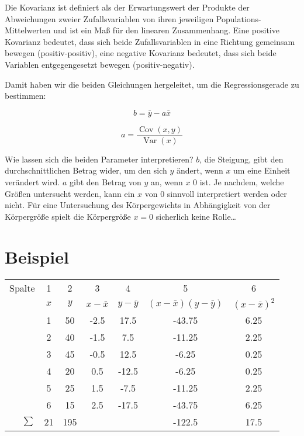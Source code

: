 \documentclass[ngerman, 12pt]{scrartcl}
\DeclareMathOperator{\cov}{Cov}
\DeclareMathOperator{\var}{Var}
\begin{document}
 
\begin{infobox}
Die Kovarianz ist definiert als der Erwartungswert der Produkte der Abweichungen zweier Zufallsvariablen von ihren jeweiligen Populations-Mittelwerten und ist ein Maß für den linearen Zusammenhang. Eine positive Kovarianz bedeutet, dass sich beide Zufallsvariablen in eine Richtung gemeinsam bewegen (positiv-positiv), eine negative Kovarianz bedeutet, dass sich beide Variablen entgegengesetzt bewegen (positiv-negativ).
\end{infobox}


Damit haben wir die beiden Gleichungen hergeleitet, um die Regressionsgerade zu bestimmen:

\begin{equation}
b=\bar{y} - a \bar{x}
\end{equation}


\begin{equation}
a =  \dfrac{\cov(x,y)}{\var(x)}
\end{equation}

Wie lassen sich die beiden Parameter interpretieren? \(b\), die Steigung, gibt den durchschnittlichen Betrag wider, um den sich \(y\) ändert, wenn \(x\) um eine Einheit verändert wird. \(a\) gibt den Betrag von \(y\) an, wenn \(x\) 0 ist. Je nachdem, welche Größen untersucht werden, kann ein \(x\) von 0 sinnvoll interpretiert werden oder nicht. Für eine Untersuchung des  Körpergewichts in Abhängigkeit von der Körpergröße spielt die Körpergröße \(x=0\) sicherlich keine Rolle\ldots    

\clearpage\section{Beispiel}

\begin{center}
\begin{tabular}{r|cccccc} \toprule
Spalte & 1 & 2 & 3 & 4 & 5 & 6 \\
& $x$	&	$y$	&	$x-\bar{x}$	&	$y-\bar{y}$	&	$(x-\bar{x})(y-\bar{y})$	&	$(x-\bar{x})^2$	\\ \midrule
& 1 &  50 &      -2.5 &      17.5 &                -43.75 &          6.25 \\
& 2 &  40 &      -1.5 &       7.5 &                -11.25 &          2.25 \\
& 3 &  45 &      -0.5 &      12.5 &                 -6.25 &          0.25 \\
& 4 &  20 &       0.5 &     -12.5 &                 -6.25 &          0.25 \\
& 5 &  25 &       1.5 &      -7.5 &                -11.25 &          2.25 \\
& 6 &  15 &       2.5 &     -17.5 &                -43.75 &          6.25 \\
\midrule
$\sum$ & 21 & 195 & & & -122.5 & 17.5 \\ \bottomrule
\end{tabular}
\end{center}
\end{document}
